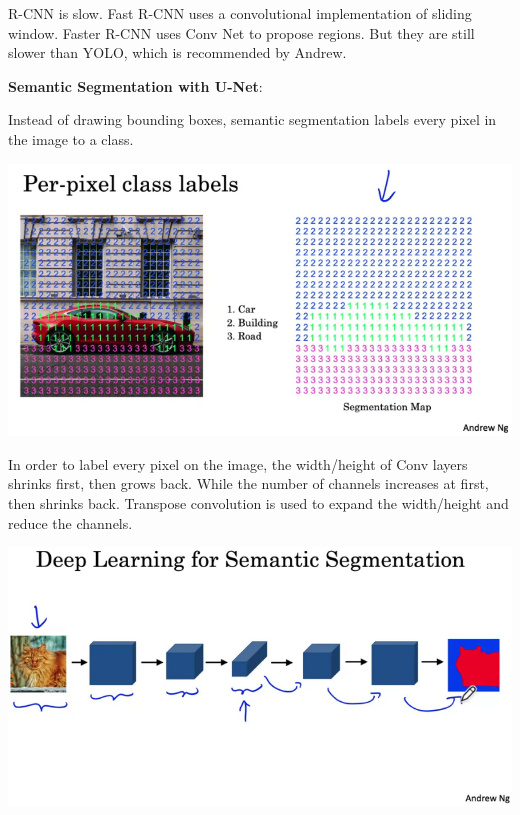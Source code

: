 \documentclass{article}
\begin{document}
\noindent R-CNN is slow. Fast R-CNN uses a convolutional implementation of sliding window. Faster R-CNN uses Conv Net to propose regions. But they are still slower than YOLO, which is recommended by Andrew.

\bigskip

\noindent \textbf{Semantic Segmentation with U-Net}:

\noindent Instead of drawing bounding boxes, semantic segmentation labels every pixel in the image to a class.

\begin{center}
\includegraphics[scale=0.4]{./images/semantic_segmentation.png}
\end{center}

\noindent In order to label every pixel on the image, the width/height of Conv layers shrinks first, then grows back. While the number of channels increases at first, then shrinks back. Transpose convolution is used to expand the width/height and reduce the channels.

\begin{center}
\includegraphics[scale=0.4]{./images/semantic_segmentation_nn.png}
\end{center}
\end{document}
